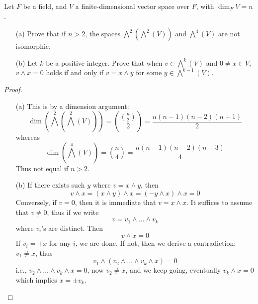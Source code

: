\begin{prob}[S2011-Q4]
    Let \(F\) be a field, and \(V\) a finite-dimensional vector space over \(F\), with \(\dim_F V=n\).
    \begin{itemize}
        \item[(a)] Prove that if \(n>2\), the spaces \(\bigwedge^2(\bigwedge^2(V))\) and \(\bigwedge^4(V)\) are not isomorphic.
        \item[(b)] Let \(k\) be a positive integer. Prove that when \(v\in\bigwedge^k(V)\) and \(0\neq x\in V\), \(v\wedge x=0\) holds if and only if \(v=x\wedge y\) for some \(y\in\bigwedge^{k-1}(V)\).
    \end{itemize}
\end{prob}
\begin{proof}
    \begin{itemize}
        \item[(a)] This is by a dimension argument:
        \begin{equation*}
            \dim\left(\bigwedge^2(\bigwedge^2(V))\right)=\binom{\binom{n}{2}}{2}=\frac{n(n-1)(n-2)(n+1)}{2}
        \end{equation*}
        whereas 
        \begin{equation*}
            \dim\left(\bigwedge^4(V)\right)=\binom{n}{4}=\frac{n(n-1)(n-2)(n-3)}{4}
        \end{equation*}
        Thus not equal if $n>2$.
        \item[(b)] If there exists such $y$ where $v=x\wedge y$, then 
        \begin{equation*}
            v\wedge x=(x\wedge y)\wedge x=(-y\wedge x)\wedge x=0
        \end{equation*}
        Conversely, if $v=0$, then it is immediate that $v=x\wedge x$. It suffices to assume that $v\neq 0$, thus if we write 
        \begin{equation*}
            v=v_1\wedge\dots\wedge v_k
        \end{equation*}
        where $v_i$'s are distinct. Then 
        \begin{equation*}
            v\wedge x=0
        \end{equation*}
        If $v_i=\pm x$ for any $i$, we are done. If not, then we derive a contradiction: $v_1\neq x$, thus 
        \begin{equation*}
            v_1\wedge\left(v_2\wedge\dots\wedge v_k\wedge x\right)=0
        \end{equation*}
        i.e., $v_2\wedge\dots\wedge v_k\wedge x=0$, now $v_2\neq x$, and we keep going, eventually $v_k\wedge x=0$ which implies $x=\pm v_k$. 
    \end{itemize}
\end{proof}



